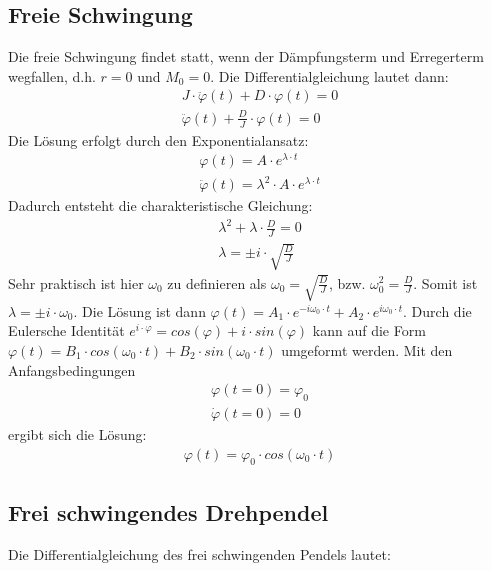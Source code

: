 \documentclass{article}
\begin{document}
\subsection{Freie Schwingung}
Die freie Schwingung findet statt, wenn der Dämpfungsterm und Erregerterm wegfallen, d.h. $r = 0$ und $M_{0} = 0$.
Die Differentialgleichung lautet dann:
\begin{gather} \label{eq:freie_schwingung}
    J \cdot \ddot \varphi(t) + D \cdot \varphi(t) = 0\\
    \ddot \varphi(t) + \frac{D}{J} \cdot \varphi(t) = 0
\end{gather}
Die Lösung erfolgt durch den Exponentialansatz:
\begin{gather} \label{eq:freie_schwingung_ansatz}
    \varphi(t) = A \cdot e^{\lambda \cdot t}\\
    \ddot \varphi(t) = \lambda^{2} \cdot A \cdot e^{\lambda \cdot t}
\end{gather}
Dadurch entsteht die charakteristische Gleichung:
\begin{gather} \label{eq:freie_schwingung_char_gl}
    \lambda^{2} + \lambda \cdot \frac{D}{J} = 0\\
    \lambda = \pm i \cdot \sqrt{\frac{D}{J}}
\end{gather}
Sehr praktisch ist hier $\omega_{0}$ zu definieren als $\omega_{0} = \sqrt{\frac{D}{J}}$, bzw. $\omega_{0}^{2} = \frac{D}{J}$.
Somit ist $\lambda = \pm i \cdot \omega_{0}$. Die Lösung ist dann
$\varphi(t) = A_{1} \cdot e^{-i \omega_{0} \cdot t} + A_{2} \cdot e^{i \omega_{0} \cdot t}$.
Durch die Eulersche Identität $e^{i \cdot \varphi} = cos(\varphi) + i \cdot sin(\varphi)$ kann auf die Form
$\varphi(t) = B_{1} \cdot cos(\omega_{0} \cdot t) + B_{2} \cdot sin(\omega_{0} \cdot t)$ umgeformt werden. Mit den Anfangsbedingungen
\begin{gather} \label{eq:freie_schwingung_anfangsbed}
    \varphi(t = 0) = \varphi_{0}\\
    \dot \varphi(t = 0) = 0
\end{gather}
ergibt sich die Lösung:
\begin{gather} \label{eq:freie_schwingung_loesung}
    \varphi(t) = \varphi_{0} \cdot cos(\omega_{0} \cdot t)
\end{gather}

\subsection{Frei schwingendes Drehpendel}
Die Differentialgleichung des frei schwingenden Pendels lautet:
\end{document}
